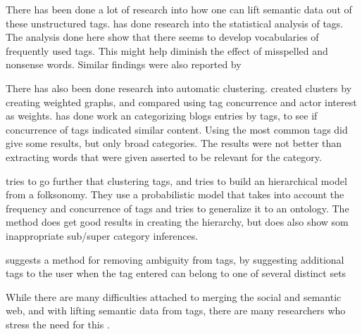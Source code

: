 There has been done a lot of research into how one can lift semantic data out of these unstructured tags.
\citet{Golder2005} has done research into the statistical analysis of tags.
The analysis done here show that there seems to develop vocabularies of frequently used tags.
This might help diminish the effect of misspelled and nonsense words. Similar findings were also reported by \citep{Shirky2007}

There has also been done research into automatic clustering.
\citet{Mika2005} created clusters by creating weighted graphs, and compared using tag concurrence and actor interest as weights.
\citet{Brooks2006} has done work an categorizing blogs entries by tags, to see if concurrence of tags indicated similar content.
Using the most common tags did give some results, but only broad categories. The results were not better than extracting words that were given asserted to be relevant for the category.

\citep{Tang2009} tries to go further that clustering tags, and tries to build an hierarchical model from a folksonomy.
They use a probabilistic model that takes into account the frequency and concurrence of tags and tries to generalize it to an ontology.
The method does get good results in creating the hierarchy, but does also show som inappropriate sub/super category inferences.

\citet{Weinberger2008} suggests a method for removing ambiguity from tags,
 by suggesting additional tags to the user when the tag entered can belong to one of several distinct sets

While there are many difficulties attached to merging the social and semantic web,
and with lifting semantic data from tags, there are many researchers who stress the need for this \citep{Passant2007,Mika2005, Gruber2007}.

